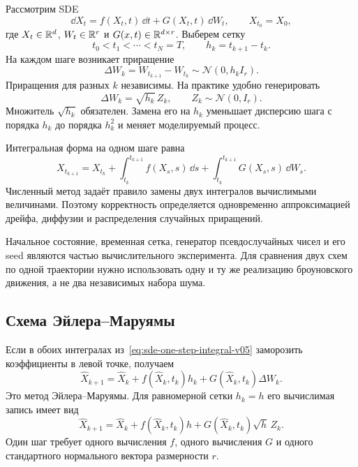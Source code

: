 Рассмотрим SDE
\begin{equation}
\label{eq:sde-for-em-v05}
\dd X_t
=
f(X_t,t)\,\dd t
+
G(X_t,t)\,\dd W_t,
\qquad
X_{t_0}=X_0,
\end{equation}
где $X_t\in\mathbb{R}^d$, $W_t\in\mathbb{R}^r$ и $G(x,t)\in\mathbb{R}^{d\times r}$. Выберем сетку
\begin{equation}
\label{eq:time-grid-v05}
t_0<t_1<\cdots<t_N=T,
\qquad
h_k=t_{k+1}-t_k.
\end{equation}
На каждом шаге возникает приращение
\begin{equation}
\label{eq:brownian-increment-grid-v05}
\Delta W_k
=
W_{t_{k+1}}-W_{t_k}
\sim
\mathcal N(0,h_k I_r).
\end{equation}
Приращения для разных $k$ независимы. На практике удобно генерировать
\begin{equation}
\label{eq:brownian-increment-normal-v05}
\Delta W_k=\sqrt{h_k}\,Z_k,
\qquad
Z_k\sim\mathcal N(0,I_r).
\end{equation}
Множитель $\sqrt{h_k}$ обязателен. Замена его на $h_k$ уменьшает дисперсию шага с порядка $h_k$ до порядка $h_k^2$ и меняет моделируемый процесс.

Интегральная форма на одном шаге равна
\begin{equation}
\label{eq:sde-one-step-integral-v05}
X_{t_{k+1}}
=
X_{t_k}
+
\int_{t_k}^{t_{k+1}} f(X_s,s)\,\dd s
+
\int_{t_k}^{t_{k+1}} G(X_s,s)\,\dd W_s.
\end{equation}
Численный метод задаёт правило замены двух интегралов вычислимыми величинами. Поэтому корректность определяется одновременно аппроксимацией дрейфа, диффузии и распределения случайных приращений.

\begin{computationalnote}
Начальное состояние, временная сетка, генератор псевдослучайных чисел и его seed являются частью вычислительного эксперимента. Для сравнения двух схем по одной траектории нужно использовать одну и ту же реализацию броуновского движения, а не два независимых набора шума.
\end{computationalnote}

\subsection{Схема Эйлера--Маруямы}

Если в обоих интегралах из~\eqref{eq:sde-one-step-integral-v05} заморозить коэффициенты в левой точке, получаем
\begin{equation}
\label{eq:euler-maruyama-general-v05}
\widehat X_{k+1}
=
\widehat X_k
+
f(\widehat X_k,t_k)h_k
+
G(\widehat X_k,t_k)\Delta W_k.
\end{equation}
Это метод Эйлера--Маруямы. Для равномерной сетки $h_k=h$ его вычислимая запись имеет вид
\begin{equation}
\label{eq:euler-maruyama-standard-normal-v05}
\widehat X_{k+1}
=
\widehat X_k
+
f(\widehat X_k,t_k)h
+
G(\widehat X_k,t_k)\sqrt h\,Z_k.
\end{equation}
Один шаг требует одного вычисления $f$, одного вычисления $G$ и одного стандартного нормального вектора размерности $r$.

